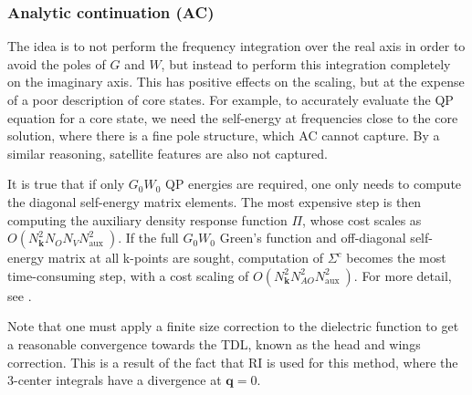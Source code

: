 \subsubsection{Analytic continuation (AC)}
 The idea is to not perform the frequency integration over the real axis in order to avoid the poles of $G$ and $W$, but instead to perform this integration completely on the imaginary axis. This has positive effects on the scaling, but at the expense of a poor description of core states. For example, to accurately evaluate the QP equation for a core state, we need the self-energy at frequencies close to the core solution, where there is a fine pole structure, which AC cannot capture. By a similar reasoning, satellite features are also not captured. 
\begin{tcolorbox}[colback=blue!5!white,colframe=blue!75!black,title=Scaling analysis for extended systems]
It is true that if only $G_0 W_0$ QP energies are required, one only needs to compute the diagonal self-energy matrix elements. The most expensive step is then computing the auxiliary density response function $\Pi$, whose cost scales as $O\left(N_{\bm{k}}^2 N_{O} N_V N_{\text {aux }}^2\right)$.  If the full $G_0 W_0$ Green's function and off-diagonal self-energy matrix at all k-points are sought, computation of $\Sigma ^c$ becomes the most time-consuming step, with a cost scaling of $O\left(N_{\bm{k}}^2 N_{AO}^2 N_{\text {aux }}^2\right)$. For more detail, see \cite{Zhu2020-nt}.
\end{tcolorbox}
Note that one must apply a finite size correction to the dielectric function to get a reasonable convergence towards the TDL, known as the head and wings correction. This is a result of the fact that RI is used for this method, where the 3-center integrals have a divergence at $\mathbf{q} = 0$.
